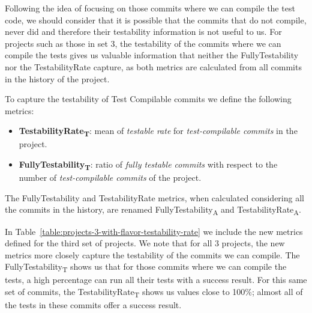 Following the idea of focusing on those commits where we can compile the test code, we should consider that it is possible that the commits that do not compile, never did and therefore their testability information is not useful to us.
For projects such as those in set 3, the testability of the commits where we can compile the tests gives us valuable information that neither the FullyTestability nor the TestabilityRate capture, as both metrics are calculated from all commits in the history of the project.

To capture the testability of Test Compilable commits we define the following metrics:
\begin{itemize}
    \item \textbf{TestabilityRate\textsubscript{T}}: mean of \textit{testable rate} for \textit{test-compilable commits} in the project.
    \item \textbf{FullyTestability\textsubscript{T}}: ratio of \textit{fully testable commits} with respect to the number of \textit{test-compilable commits} of the project.
\end{itemize}
The FullyTestability and TestabilityRate metrics, when calculated considering all the commits in the history, are renamed FullyTestability\textsubscript{A} and TestabilityRate\textsubscript{A}.

In Table~\ref{table:projects-3-with-flavor-testability-rate} we include the new metrics defined for the third set of projects. 
We note that for all 3 projects, the new metrics more closely capture the testability of the commits we can compile.
The FullyTestability\textsubscript{T} shows us that for those commits where we can compile the tests, a high percentage can run all their tests with a success result. For this same set of commits, the TestabilityRate\textsubscript{T} shows us values close to 100\%; almost all of the tests in these commits offer a success result.

